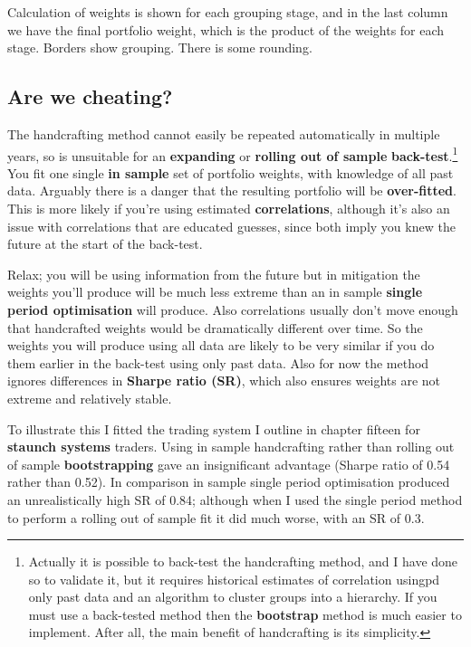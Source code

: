 Calculation of weights is shown for each grouping stage, and in the last column we have the final portfolio weight, which is the product of the weights for each stage. Borders show grouping. There is some rounding.

\subsection*{Are we cheating?}

The handcrafting method cannot easily be repeated automatically in multiple years, so is unsuitable for an \textbf{expanding} or \textbf{rolling out of sample} \textbf{back-test}.\footnote{Actually it is possible to back-test the handcrafting method, and I have done so to validate it, but it requires historical estimates of correlation usingpd only past data and an algorithm to cluster groups into a hierarchy. If you must use a back-tested method then the \textbf{bootstrap} method is much easier to implement. After all, the main benefit of handcrafting is its simplicity.} You fit one single \textbf{in sample} set of portfolio weights, with knowledge of all past data. Arguably there is a danger that the resulting portfolio will be \textbf{over-fitted}. This is more likely if you're using estimated \textbf{correlations}, although it's also an issue with correlations that are educated guesses, since both imply you knew the future at the start of the back-test.

Relax; you will be using information from the future but in mitigation the weights you'll produce will be much less extreme than an in sample \textbf{single period optimisation} will produce. Also correlations usually don't move enough that handcrafted weights would be dramatically different over time. So the weights you will produce using all data are likely to be very similar if you do them earlier in the back-test using only past data. Also for now the method ignores differences in \textbf{Sharpe ratio (SR)}, which also ensures weights are not extreme and relatively stable.

To illustrate this I fitted the trading system I outline in chapter fifteen for \textbf{staunch systems} traders. Using in sample handcrafting rather than rolling out of sample \textbf{bootstrapping} gave an insignificant advantage (Sharpe ratio of 0.54 rather than 0.52). In comparison in sample single period optimisation produced an unrealistically high SR of 0.84; although when I used the single period method to perform a rolling out of sample fit it did much worse, with an SR of 0.3.

